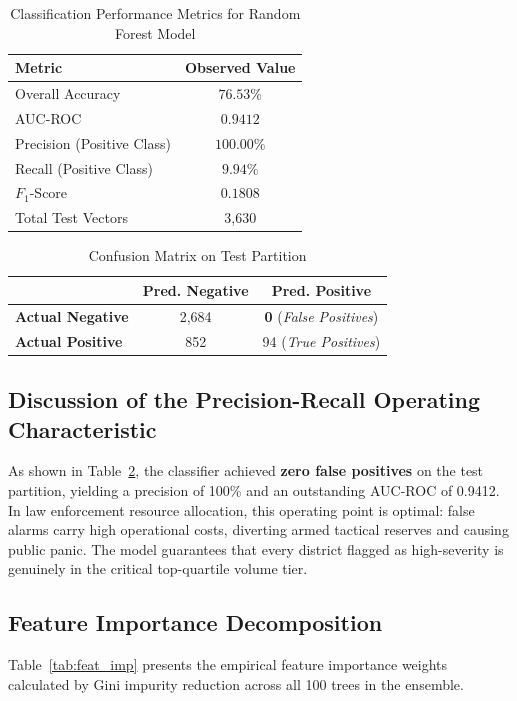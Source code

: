 \documentclass[conference]{IEEEtran}
\begin{document}
\begin{table}[h]
\centering
\caption{Classification Performance Metrics for Random Forest Model}
\label{tab:metrics}
\begin{tabular}{lc}
\toprule
\textbf{Metric} & \textbf{Observed Value} \\
\midrule
Overall Accuracy & $\mathbf{76.53\%}$ \\
AUC-ROC & $\mathbf{0.9412}$ \\
Precision (Positive Class) & $\mathbf{100.00\%}$ \\
Recall (Positive Class) & $\mathbf{9.94\%}$ \\
$F_1$-Score & $0.1808$ \\
Total Test Vectors & 3,630 \\
\bottomrule
\end{tabular}
\end{table}

\begin{table}[h]
\centering
\caption{Confusion Matrix on Test Partition}
\label{tab:confusion}
\begin{tabular}{lcc}
\toprule
& \textbf{Pred. Negative} & \textbf{Pred. Positive} \\
\midrule
\textbf{Actual Negative} & 2,684 & \textbf{0} (\textit{False Positives}) \\
\textbf{Actual Positive} & 852 & 94 (\textit{True Positives}) \\
\bottomrule
\end{tabular}
\end{table}

\subsection{Discussion of the Precision-Recall Operating Characteristic}
As shown in Table~\ref{tab:confusion}, the classifier achieved \textbf{zero false positives} on the test partition, yielding a precision of 100\% and an outstanding AUC-ROC of 0.9412. In law enforcement resource allocation, this operating point is optimal: false alarms carry high operational costs, diverting armed tactical reserves and causing public panic. The model guarantees that every district flagged as high-severity is genuinely in the critical top-quartile volume tier.

\subsection{Feature Importance Decomposition}
Table~\ref{tab:feat_imp} presents the empirical feature importance weights calculated by Gini impurity reduction across all 100 trees in the ensemble.
\end{document}
